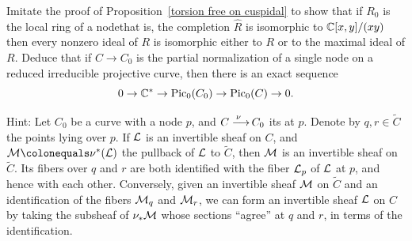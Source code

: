 \begin{exercise}\label{linear series on a nodal curve}
Imitate the proof of Proposition~\ref{torsion free on cuspidal} to
show that if $R_{0}$ is the local ring of a node\emdash that is, the
completion $\widehat R$ is isomorphic to ${\mathbb C}[x,y]/(xy)$\emdash then
every nonzero ideal of $R$ is isomorphic
either to $R$ or to the maximal ideal of $R$. Deduce that if $C\to C_{0}$
is the
partial normalization of a single node on a reduced irreducible projective
curve, then there is an exact sequence
$$0\to {\mathbb C}^{*} \to \operatorname{Pic}_{0}(C_{0}) \to \operatorname{Pic}_{0}(C) \to 0.$$

Hint:
Let $C_{0}$ be a curve with a node $p$, and $C \ruto {\,\nu} C_{0}$
%
its 
at $p$. Denote by $q,r \in \widetilde C$
the points lying over $p$. If ${\mathcal L}$ is an invertible sheaf on $C$, and
$\cM \colonequals  \nu^*(\cL)$ the pullback of ${\mathcal L}$ to $\widetilde C$,
then ${\mathcal M}$ is an invertible sheaf on $\widetilde C$. Its fibers over $q$
and $r$ are both identified with the fiber ${\mathcal L}_p$ of ${\mathcal L}$ at $p$, and
hence with each other. Conversely, given an invertible sheaf ${\mathcal M}$ on
$\widetilde C$ and an identification of the fibers ${\mathcal M}_q$ and ${\mathcal M}_r$,
we can form an invertible sheaf ${\mathcal L}$ on $C$ by taking the subsheaf
of $\nu_*{\mathcal M}$ whose sections ``agree'' at $q$ and $r$, in terms of the
identification.
\end{exercise}

